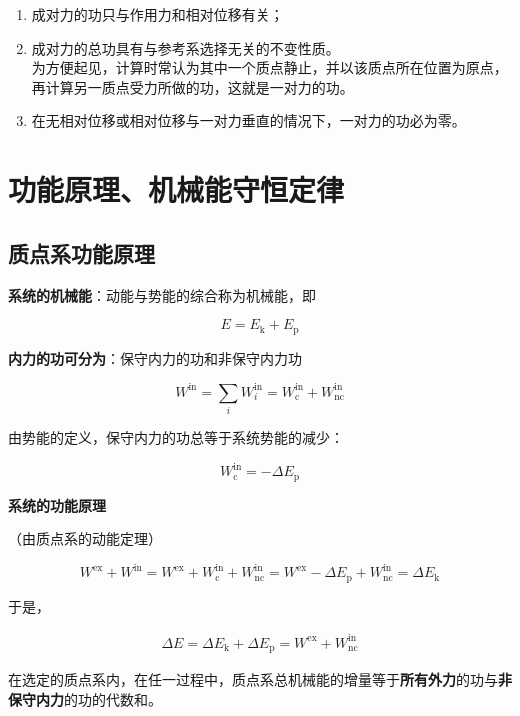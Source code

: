 \documentclass[12pt, a4paper]{article}
\numberwithin{equation}{section}
\begin{document}
    \begin{enumerate}
        \item 成对力的功只与作用力和相对位移有关；
        \item 成对力的总功具有与参考系选择无关的不变性质。\\
            为方便起见，计算时常认为其中一个质点静止，并以该质点所在位置为原点，
            再计算另一质点受力所做的功，这就是一对力的功。
        \item 在无相对位移或相对位移与一对力垂直的情况下，一对力的功必为零。
    \end{enumerate}

\section{功能原理、机械能守恒定律}

\subsection{质点系功能原理}

    \textbf{系统的机械能}：动能与势能的综合称为机械能，即

    \[
        E = E_{\mathrm{k}} + E_{\mathrm{p}}
    \]

    \textbf{内力的功可分为}：保守内力的功和非保守内力功

    \[
        W^{\mathrm{in}} = \sum_{i} W_{i}^{\mathrm{in}} =
        W_{\mathrm{c}}^{\mathrm{in}} + W_{\mathrm{nc}}^{\mathrm{in}}
    \]

    由势能的定义，保守内力的功总等于系统势能的减少：

    \[
        W_{\mathrm{c}}^{\mathrm{in}} = - \Delta E_{\mathrm{p}}
    \]

    \textbf{系统的功能原理}

    （由质点系的动能定理）

    \[
        W^{\mathrm{ex}} + W^{\mathrm{in}} = W^{\mathrm{ex}} + W_{\mathrm{c}}^{\mathrm{in}}
        + W_{\mathrm{nc}}^{\mathrm{in}} = W^{\mathrm{ex}} - \Delta E_{\mathrm{p}} +
        W_{\mathrm{nc}}^{\mathrm{in}} = \Delta E_{\mathrm{k}}
    \]

    于是，

    \begin{align}
        \Delta E = \Delta E_{\mathrm{k}} + \Delta E_{\mathrm{p}} =
        W^{\mathrm{ex}} + W_{\mathrm{nc}}^{\mathrm{in}}
    \end{align}

    在选定的质点系内，在任一过程中，质点系总机械能的增量等于\textbf{所有外力}的功与\textbf{非保守内力}的功的代数和。
\end{document}
